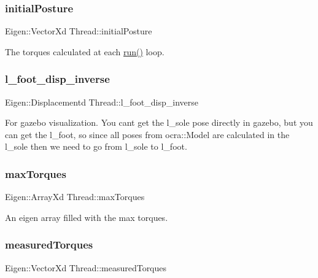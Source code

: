 \subsubsection{\texorpdfstring{initial\+Posture}{initialPosture}}
{\footnotesize\ttfamily Eigen\+::\+Vector\+Xd Thread\+::initial\+Posture\hspace{0.3cm}{\ttfamily [private]}}

The torques calculated at each \hyperlink{classThread_ad9373d8d725c46717dfce3130018fe3a}{run()} loop. \hypertarget{classThread_a304e7ee40ec0ceec2fc7ca80353ab478}{}\label{classThread_a304e7ee40ec0ceec2fc7ca80353ab478} 
\subsubsection{\texorpdfstring{l\+\_\+foot\+\_\+disp\+\_\+inverse}{l\_foot\_disp\_inverse}}
{\footnotesize\ttfamily Eigen\+::\+Displacementd Thread\+::l\+\_\+foot\+\_\+disp\+\_\+inverse\hspace{0.3cm}{\ttfamily [private]}}

For gazebo visualization. You can\textquotesingle{}t get the l\+\_\+sole pose directly in gazebo, but you can get the l\+\_\+foot, so since all poses from ocra\+::\+Model are calculated in the l\+\_\+sole then we need to go from l\+\_\+sole to l\+\_\+foot. \hypertarget{classThread_af28a4fcbbcbf77c42237c0be75a25a54}{}\label{classThread_af28a4fcbbcbf77c42237c0be75a25a54} 
\subsubsection{\texorpdfstring{max\+Torques}{maxTorques}}
{\footnotesize\ttfamily Eigen\+::\+Array\+Xd Thread\+::max\+Torques\hspace{0.3cm}{\ttfamily [private]}}

An eigen array filled with the max torques. \hypertarget{classThread_aa9cbe8744e51571a17fa726d8d16a0c6}{}\label{classThread_aa9cbe8744e51571a17fa726d8d16a0c6} 
\subsubsection{\texorpdfstring{measured\+Torques}{measuredTorques}}
{\footnotesize\ttfamily Eigen\+::\+Vector\+Xd Thread\+::measured\+Torques\hspace{0.3cm}{\ttfamily [private]}}

